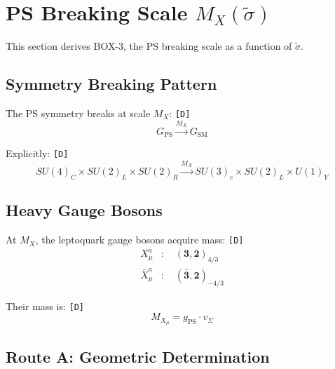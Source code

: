 \documentclass[11pt,a4paper]{article}
\newcommand{\tagD}{\textcolor{green!50!black}{\texttt{[D]}}}
\theoremstyle{definition}
\begin{document}
\section{PS Breaking Scale $M_X(\tilde{\sigma})$}
\label{sec:mx-scale}

This section derives BOX-3, the PS breaking scale as a function of $\tilde{\sigma}$.

\subsection{Symmetry Breaking Pattern}
\label{subsec:symmetry-breaking}

The PS symmetry breaks at scale $M_X$: \tagD{}
\begin{equation}
\label{eq:ps-breaking}
G_{\text{PS}} \xrightarrow{M_X} G_{\text{SM}}
\end{equation}

Explicitly: \tagD{}
\begin{equation}
\label{eq:ps-to-sm}
SU(4)_C \times SU(2)_L \times SU(2)_R \xrightarrow{M_X} SU(3)_c \times SU(2)_L \times U(1)_Y
\end{equation}

\subsection{Heavy Gauge Bosons}
\label{subsec:heavy-bosons}

At $M_X$, the leptoquark gauge bosons acquire mass: \tagD{}
\begin{align}
\label{eq:leptoquark-x}
X_\mu^a &: \quad (\mathbf{3}, \mathbf{2})_{4/3} \\
\label{eq:leptoquark-xbar}
\bar{X}_\mu^a &: \quad (\bar{\mathbf{3}}, \mathbf{2})_{-4/3}
\end{align}

Their mass is: \tagD{}
\begin{equation}
\label{eq:leptoquark-mass}
M_{X_\mu} = g_{\text{PS}} \cdot v_\Sigma
\end{equation}

\subsection{Route A: Geometric Determination}
\label{subsec:route-a}
\end{document}
